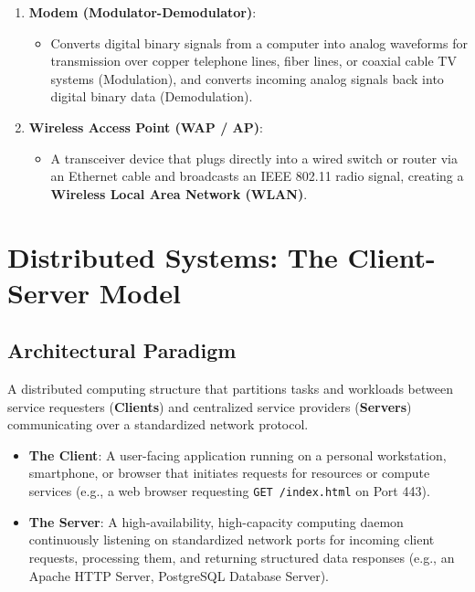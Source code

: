\begin{enumerate}[leftmargin=1.5em]
    \item \textbf{Modem (Modulator-Demodulator)}:
    \begin{itemize}
        \item Converts digital binary signals from a computer into analog waveforms for transmission over copper telephone lines, fiber lines, or coaxial cable TV systems (Modulation), and converts incoming analog signals back into digital binary data (Demodulation).
    \end{itemize}

    \item \textbf{Wireless Access Point (WAP / AP)}:
    \begin{itemize}
        \item A transceiver device that plugs directly into a wired switch or router via an Ethernet cable and broadcasts an IEEE 802.11 radio signal, creating a \textbf{Wireless Local Area Network (WLAN)}.
    \end{itemize}
\end{enumerate}

\section{Distributed Systems: The Client-Server Model}

\subsection{Architectural Paradigm}

\begin{definition}
A distributed computing structure that partitions tasks and workloads between service requesters (\textbf{Clients}) and centralized service providers (\textbf{Servers}) communicating over a standardized network protocol.
\end{definition}

\begin{itemize}[leftmargin=1.5em]
    \item \textbf{The Client}: A user-facing application running on a personal workstation, smartphone, or browser that initiates requests for resources or compute services (e.g., a web browser requesting \texttt{GET /index.html} on Port 443).
    \item \textbf{The Server}: A high-availability, high-capacity computing daemon continuously listening on standardized network ports for incoming client requests, processing them, and returning structured data responses (e.g., an Apache HTTP Server, PostgreSQL Database Server).
\end{itemize}

